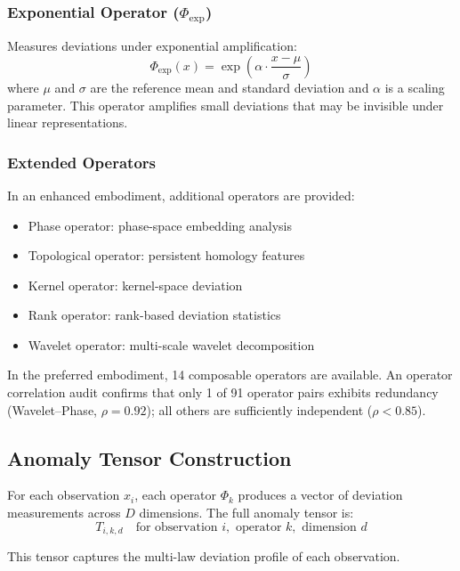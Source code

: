 \documentclass[12pt,a4paper]{article}
\begin{document}
\subsubsection{Exponential Operator ($\Phi_{\text{exp}}$)}

Measures deviations under exponential amplification:
\begin{equation}
\Phi_{\text{exp}}(x) = \exp\left(\alpha \cdot \frac{x - \mu}{\sigma}\right)
\end{equation}
where $\mu$ and $\sigma$ are the reference mean and standard deviation and 
$\alpha$ is a scaling parameter. This operator amplifies small deviations 
that may be invisible under linear representations.

\subsubsection{Extended Operators}

In an enhanced embodiment, additional operators are provided:
\begin{itemize}
\item Phase operator: phase-space embedding analysis
\item Topological operator: persistent homology features
\item Kernel operator: kernel-space deviation
\item Rank operator: rank-based deviation statistics
\item Wavelet operator: multi-scale wavelet decomposition
\end{itemize}

In the preferred embodiment, 14 composable operators are available. An 
operator correlation audit confirms that only 1 of 91 operator pairs 
exhibits redundancy (Wavelet--Phase, $\rho = 0.92$); all others are 
sufficiently independent ($\rho < 0.85$).

\subsection{Anomaly Tensor Construction}

For each observation $x_i$, each operator $\Phi_k$ produces a vector of 
deviation measurements across $D$ dimensions. The full anomaly tensor is:
\begin{equation}
T_{i,k,d} \quad \text{for observation } i, \text{ operator } k, 
\text{ dimension } d
\end{equation}

This tensor captures the multi-law deviation profile of each observation.
\end{document}
